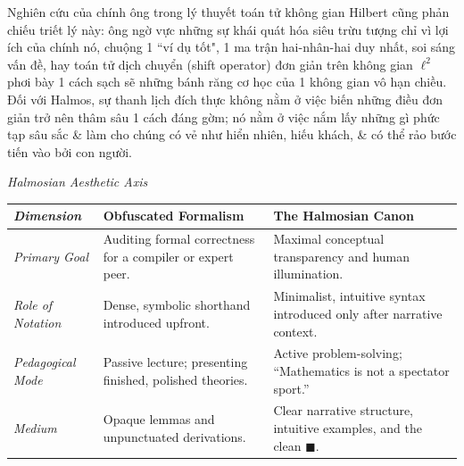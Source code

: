 \documentclass[11pt]{article}
\begin{document}
Nghiên cứu của chính ông trong lý thuyết toán tử không gian Hilbert cũng phản chiếu triết lý này: ông ngờ vực những sự khái quát hóa siêu trừu tượng chỉ vì lợi ích của chính nó, chuộng 1 ``ví dụ tốt", 1 ma trận hai-nhân-hai duy nhất, soi sáng vấn đề, hay toán tử dịch chuyển (shift operator) đơn giản trên không gian $\ell^2$ phơi bày 1 cách sạch sẽ những bánh răng cơ học của 1 không gian vô hạn chiều. Đối với Halmos, sự thanh lịch đích thực không nằm ở việc biến những điều đơn giản trở nên thâm sâu 1 cách đáng gờm; nó nằm ở việc nắm lấy những gì phức tạp sâu sắc \& làm cho chúng có vẻ như hiển nhiên, hiếu khách, \& có thể rảo bước tiến vào bởi con người.

\emph{Halmosian Aesthetic Axis}
\begin{table}[H]
\centering
\begin{tabular}{@{}p{3cm}p{6cm}p{6cm}@{}}
\toprule
\emph{Dimension} & \textbf{Obfuscated Formalism} & \textbf{The Halmosian Canon} \\
\midrule
\emph{Primary Goal} & Auditing formal correctness for a compiler or expert peer. & Maximal conceptual transparency and human illumination. \\

\emph{Role of Notation} & Dense, symbolic shorthand introduced upfront. & Minimalist, intuitive syntax introduced only after narrative context. \\

\emph{Pedagogical Mode} & Passive lecture; presenting finished, polished theories. & Active problem-solving; ``Mathematics is not a spectator sport.'' \\

\emph{Medium} & Opaque lemmas and unpunctuated derivations. & Clear narrative structure, intuitive examples, and the clean $\blacksquare$. \\
\bottomrule
\end{tabular}
\end{table}
\end{document}
